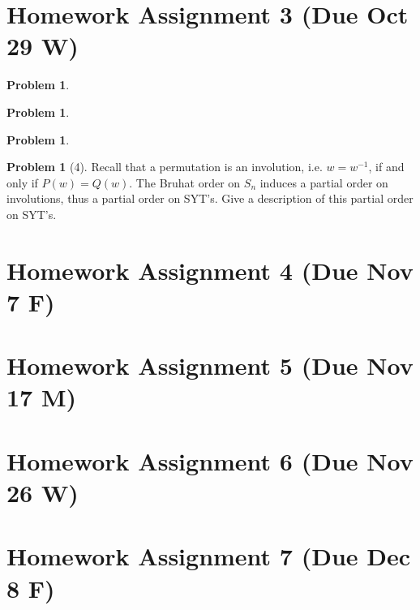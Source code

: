 \documentclass{amsart}
\theoremstyle{plain}
\theoremstyle{definition}
\newtheorem{problem}[theorem]{Problem}
\begin{document}
	
	\section{Homework Assignment 3 (Due Oct 29 W)}
	\begin{problem}
	
\end{problem}
\begin{problem}
	
\end{problem}
\begin{problem}
	
\end{problem}

\begin{problem}[4]
	Recall that a permutation is an involution, i.e. $w=w^{-1}$, if and only if $P(w)=Q(w)$. The Bruhat order on $S_n$ induces a partial order on involutions, thus a partial order on SYT's. Give a description of this partial order on SYT's.
\end{problem}
	\section{Homework Assignment 4 (Due Nov 7 F)}
	\section{Homework Assignment 5 (Due Nov 17 M)}
	\section{Homework Assignment 6 (Due Nov 26 W)}
	\section{Homework Assignment 7 (Due Dec 8 F)}


	
	
	
	
	
	
	
	
\end{document}
